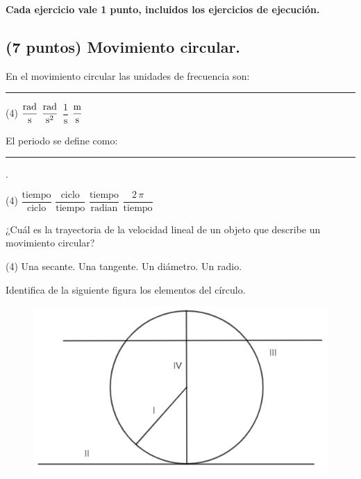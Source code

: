\documentclass[12pt, letter]{exam}
\begin{document}


\setcounter{page}{3}

\begin{center}
\textbf{Cada ejercicio vale 1 punto, incluidos los ejercicios de ejecución.}
\end{center}

\begin{questions}

    \section{(7 puntos) Movimiento circular.}

    \question En el movimiento circular las unidades de frecuencia son: \rule{2cm}{0.1mm}
    \begin{tasks}(4)
        \task $\displaystyle \unit[per-mode=fraction]{\radian\per\second}$
        \task $\displaystyle \unit[per-mode=fraction]{\radian\per\square\second}$
        \task $\dfrac{1}{\unit{\second}}$
        \task $\displaystyle \unit[per-mode=fraction]{\meter\per\second}$
    \end{tasks}
    \question El periodo se define como: \rule{2cm}{0.1mm}.
    \begin{tasks}(4)
        \task $\dfrac{\text{tiempo}}{\text{ciclo}}$
        \task $\dfrac{\text{ciclo}}{\text{tiempo}}$
        \task $\dfrac{\text{tiempo}}{\text{radian}}$
        \task $\dfrac{2 \, \pi}{\text{tiempo}}$
    \end{tasks}
    \question ¿Cuál es la trayectoria de la velocidad lineal de un objeto que describe un movimiento circular?
    \begin{tasks}(4)
        \task Una secante.
        \task Una tangente.
        \task Un diámetro.
        \task Un radio.
    \end{tasks}
    \question Identifica de la siguiente figura los elementos del círculo.
    \begin{figure}[H]
        \centering
        \includegraphics[scale=0.9]{Elementos_Circulo_02.png}
    \end{figure}
    \begin{multicols}{2}
    \begin{parts}

\end{parts}
\end{multicols}
\end{questions}
\end{document}
